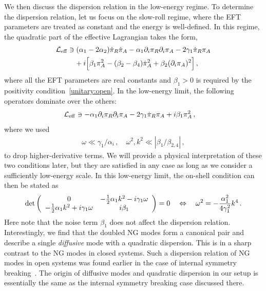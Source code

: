 \documentclass[a4paper,11pt]{article}
\begin{document}
We then discuss the dispersion relation in the low-energy regime.
To determine the dispersion relation, 
let us focus on the slow-roll regime, where the EFT parameters are treated as 
constant and the energy is well-defined. 
In this regime, the quadratic part of the effective Lagrangian takes the form,
\begin{align}
\nonumber
\mathcal{L}_{\rm eff}&\ni
(\alpha_1-2\alpha_2)\dot{\pi}_R\dot{\pi}_A-\alpha_1\partial_i\pi_R\partial_i\pi_A
-2\gamma_1\dot{\pi}_R\pi_A
\\
\label{quadratic_EFT}
&\quad
+i\Big[
\beta_1\pi_A^2-(\beta_2-\beta_4)\dot{\pi}_A^2+\beta_2(\partial_i\pi_A)^2
\Big]\,,
\end{align}
where all the EFT parameters are real constants and $\beta_1>0$ is required by the positivity condition~\eqref{unitary:open}.  In the low-energy limit, the following operators dominate over the others:
\begin{align}
\nonumber
\mathcal{L}_{\rm eff}&\ni
-\alpha_1\partial_i\pi_R\partial_i\pi_A
-2\gamma_1\dot{\pi}_R\pi_A
+i\beta_1\pi_A^2\,,
\end{align}
where we used
\begin{align}
\label{low-energy_assumptions}
\omega\ll\gamma_1/\alpha_i\,,
\quad
\omega^2,k^2\ll|\beta_1/\beta_{2,4}|\,,
\end{align}
to drop higher-derivative terms. We will provide a physical interpretation of these two conditions later, but they are satisfied in any case as long as we consider a sufficiently low-energy scale. In this low-energy limit, the on-shell condition can then be stated as
\begin{align}
{\rm det}\left(
\begin{array}{cc}0 &-\frac{1}{2} \alpha_1k^2- i\gamma_1\omega \\ -\frac{1}{2}\alpha_1k^2+i\gamma_1\omega & i\beta_1\end{array}
\right)=0
\quad
\Leftrightarrow
\quad
\omega^2=-\frac{\alpha_1^2}{4\gamma_1^2}k^4\,.
\end{align}
Here note that the noise term $\beta_1$ does not affect 
the dispersion relation. 
Interestingly, we find that the doubled NG modes form a canonical pair and 
describe a single {\it diffusive} mode with a quadratic dispersion. 
This is in a sharp contrast to the NG modes in closed systems. 
Such a dispersion relation of NG modes in open systems was found earlier 
in the case of internal symmetry breaking~\cite{Minami:2018oxl}. 
The origin of diffusive modes and quadratic dispersion in our setup is essentially the same as the internal symmetry breaking case discussed there.
\end{document}
